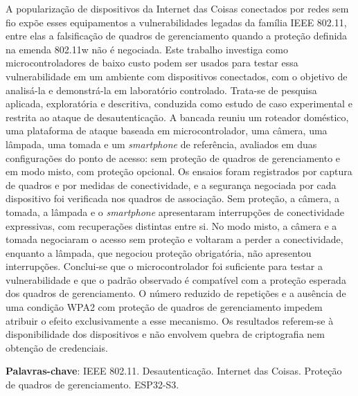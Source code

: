 \begin{resumo}[RESUMO]
\noindent A popularização de dispositivos da Internet das Coisas conectados por redes sem fio expõe esses equipamentos a vulnerabilidades legadas da família IEEE 802.11, entre elas a falsificação de quadros de gerenciamento quando a proteção definida na emenda 802.11w não é negociada. Este trabalho investiga como microcontroladores de baixo custo podem ser usados para testar essa vulnerabilidade em um ambiente com dispositivos conectados, com o objetivo de analisá-la e demonstrá-la em laboratório controlado. Trata-se de pesquisa aplicada, exploratória e descritiva, conduzida como estudo de caso experimental e restrita ao ataque de desautenticação. A bancada reuniu um roteador doméstico, uma plataforma de ataque baseada em microcontrolador, uma câmera, uma lâmpada, uma tomada e um \textit{smartphone} de referência, avaliados em duas configurações do ponto de acesso: sem proteção de quadros de gerenciamento e em modo misto, com proteção opcional. Os ensaios foram registrados por captura de quadros e por medidas de conectividade, e a segurança negociada por cada dispositivo foi verificada nos quadros de associação. Sem proteção, a câmera, a tomada, a lâmpada e o \textit{smartphone} apresentaram interrupções de conectividade expressivas, com recuperações distintas entre si. No modo misto, a câmera e a tomada negociaram o acesso sem proteção e voltaram a perder a conectividade, enquanto a lâmpada, que negociou proteção obrigatória, não apresentou interrupções. Conclui-se que o microcontrolador foi suficiente para testar a vulnerabilidade e que o padrão observado é compatível com a proteção esperada dos quadros de gerenciamento. O número reduzido de repetições e a ausência de uma condição WPA2 com proteção de quadros de gerenciamento impedem atribuir o efeito exclusivamente a esse mecanismo. Os resultados referem-se à disponibilidade dos dispositivos e não envolvem quebra de criptografia nem obtenção de credenciais.

 \vspace{\onelineskip}

 \noindent
 \textbf{Palavras-chave}: IEEE 802.11. Desautenticação. Internet das Coisas. Proteção de quadros de gerenciamento. ESP32-S3.
\end{resumo}
